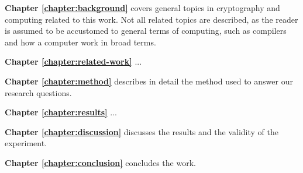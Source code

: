 

\noindent\textbf{Chapter \ref{chapter:background}} covers general topics in cryptography and computing related to this work. Not all related topics are described, as the reader is assumed to be accustomed to general terms of computing, such as compilers and how a computer work in broad terms.

\noindent\textbf{Chapter \ref{chapter:related-work}} ...

\noindent\textbf{Chapter \ref{chapter:method}} describes in detail the method used to answer our research questions.

\noindent\textbf{Chapter \ref{chapter:results}} ...

\noindent\textbf{Chapter \ref{chapter:discussion}} discusses the results and the validity of the experiment.

\noindent\textbf{Chapter \ref{chapter:conclusion}} concludes the work.